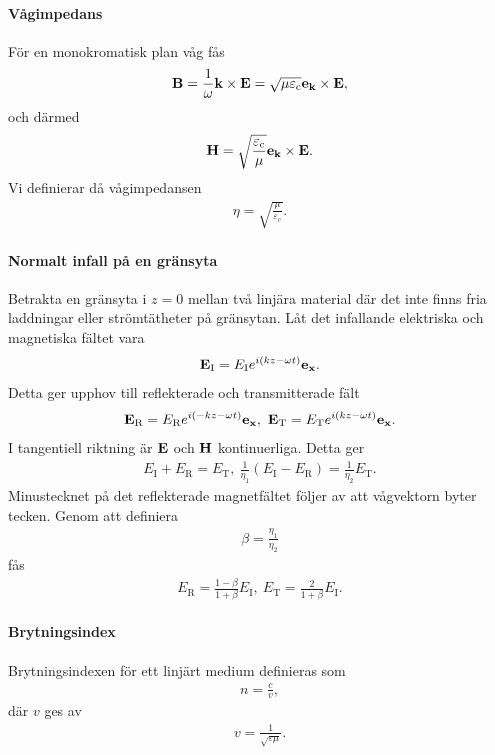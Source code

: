 \paragraph{Vågimpedans}
För en monokromatisk plan våg fås
\begin{align*}
	\vb{B} = \frac{1}{\omega}\vb{k}\times\vb{E} = \sqrt{\mu\varepsilon_{\text{c}}}\vb{e}_{\vb{k}}\times\vb{E},
\end{align*}
och därmed
\begin{align*}
	\vb{H} = \sqrt{\frac{\varepsilon_{\text{c}}}{\mu}}\vb{e}_{\vb{k}}\times\vb{E}.
\end{align*}
Vi definierar då vågimpedansen
\begin{align*}
	\eta = \sqrt{\frac{\mu}{\varepsilon_{\text{c}}}}.
\end{align*}

\paragraph{Normalt infall på en gränsyta}
Betrakta en gränsyta i $z = 0$ mellan två linjära material där det inte finns fria laddningar eller strömtätheter på gränsytan. Låt det infallande elektriska och magnetiska fältet vara
\begin{align*}
	\vb{E}_{\text{I}} = E_{\text{I}}e^{i(kz - \omega t)}\vb{e}_{\vb{x}}.
\end{align*}
Detta ger upphov till reflekterade och transmitterade fält
\begin{align*}
	\vb{E}_{\text{R}} = E_{\text{R}}e^{i(-kz - \omega t)}\ub{x},\ \vb{E}_{\text{T}} = E_{\text{T}}e^{i(kz - \omega t)}\ub{x}.
\end{align*}
I tangentiell riktning är $\vb{E}$ och $\vb{H}$ kontinuerliga. Detta ger
\begin{align*}
	E_{\text{I}} + E_{\text{R}} = E_{\text{T}},\ \frac{1}{\eta_{1}}(E_{\text{I}} - E_{\text{R}}) = \frac{1}{\eta_{2}}E_{\text{T}}.
\end{align*}
Minustecknet på det reflekterade magnetfältet följer av att vågvektorn byter tecken. Genom att definiera
\begin{align*}
	\beta = \frac{\eta_{1}}{\eta_{2}}
\end{align*}
fås
\begin{align*}
	E_{\text{R}} = \frac{1 - \beta}{1 + \beta}E_{\text{I}},\ E_{\text{T}} = \frac{2}{1 + \beta}E_{\text{I}}.
\end{align*}

\paragraph{Brytningsindex}
Brytningsindexen för ett linjärt medium definieras som
\begin{align*}
	n = \frac{c}{v},
\end{align*}
där $v$ ges av
\begin{align*}
	v = \frac{1}{\sqrt{\varepsilon\mu}}.
\end{align*}

